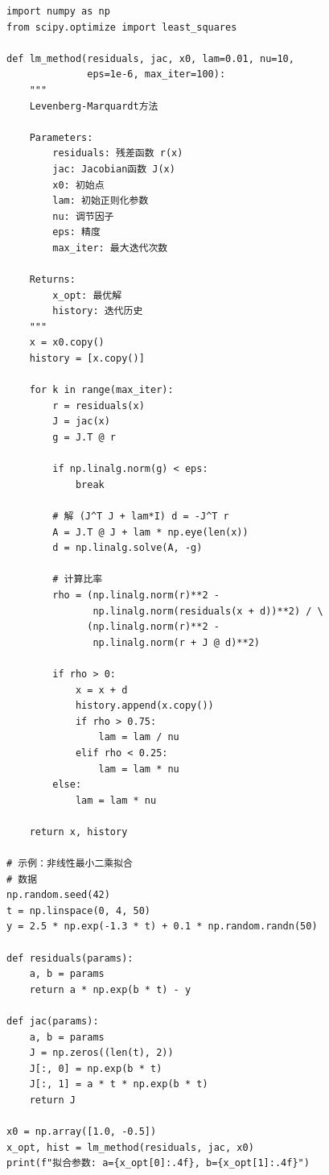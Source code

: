 \begin{codebox}
\begin{lstlisting}
import numpy as np
from scipy.optimize import least_squares

def lm_method(residuals, jac, x0, lam=0.01, nu=10, 
              eps=1e-6, max_iter=100):
    """
    Levenberg-Marquardt方法
    
    Parameters:
        residuals: 残差函数 r(x)
        jac: Jacobian函数 J(x)
        x0: 初始点
        lam: 初始正则化参数
        nu: 调节因子
        eps: 精度
        max_iter: 最大迭代次数
    
    Returns:
        x_opt: 最优解
        history: 迭代历史
    """
    x = x0.copy()
    history = [x.copy()]
    
    for k in range(max_iter):
        r = residuals(x)
        J = jac(x)
        g = J.T @ r
        
        if np.linalg.norm(g) < eps:
            break
        
        # 解 (J^T J + lam*I) d = -J^T r
        A = J.T @ J + lam * np.eye(len(x))
        d = np.linalg.solve(A, -g)
        
        # 计算比率
        rho = (np.linalg.norm(r)**2 - 
               np.linalg.norm(residuals(x + d))**2) / \
              (np.linalg.norm(r)**2 - 
               np.linalg.norm(r + J @ d)**2)
        
        if rho > 0:
            x = x + d
            history.append(x.copy())
            if rho > 0.75:
                lam = lam / nu
            elif rho < 0.25:
                lam = lam * nu
        else:
            lam = lam * nu
    
    return x, history

# 示例：非线性最小二乘拟合
# 数据
np.random.seed(42)
t = np.linspace(0, 4, 50)
y = 2.5 * np.exp(-1.3 * t) + 0.1 * np.random.randn(50)

def residuals(params):
    a, b = params
    return a * np.exp(b * t) - y

def jac(params):
    a, b = params
    J = np.zeros((len(t), 2))
    J[:, 0] = np.exp(b * t)
    J[:, 1] = a * t * np.exp(b * t)
    return J

x0 = np.array([1.0, -0.5])
x_opt, hist = lm_method(residuals, jac, x0)
print(f"拟合参数: a={x_opt[0]:.4f}, b={x_opt[1]:.4f}")
\end{lstlisting}
\end{codebox}

